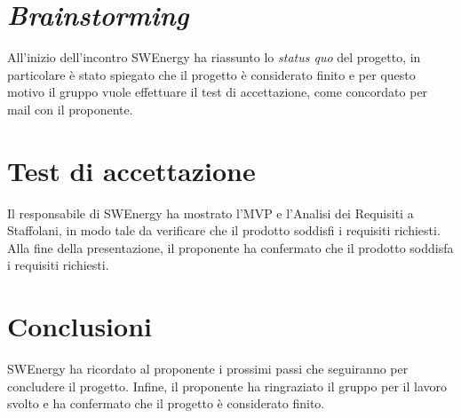 \section{\textit{Brainstorming}}

All'inizio dell'incontro SWEnergy ha riassunto lo \textit{status quo} del
progetto, in particolare è stato spiegato che il progetto è considerato finito e
per questo motivo il gruppo vuole effettuare il test di accettazione, come
concordato per mail con il proponente.

\section{Test di accettazione}

Il responsabile di SWEnergy ha mostrato l'MVP e l'Analisi dei Requisiti a
Staffolani, in modo tale da verificare che il prodotto soddisfi i requisiti
richiesti. Alla fine della presentazione, il proponente ha confermato che il
prodotto soddisfa i requisiti richiesti.

\section{Conclusioni}

SWEnergy ha ricordato al proponente i prossimi passi che seguiranno per
concludere il progetto. Infine, il proponente ha ringraziato il gruppo per il
lavoro svolto e ha confermato che il progetto è considerato finito.
